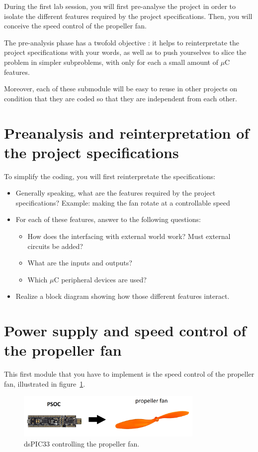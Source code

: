 \documentclass[11pt,a4paper]{article}
\theoremstyle{definition}%
\begin{document}
During the first lab session, you will first pre-analyse the project in order to isolate the different features required by the project specifications.
Then, you will conceive the speed control of the propeller fan.

The pre-analysis phase has a twofold objective : it helps to reinterpretate the project specifications with your words, as well as to push yourselves to slice the problem in simpler subproblems, with only for each a small amount of $\mu$C features.

Moreover, each of these submodule will be easy to reuse in other projects on condition that they are coded so that they are independent from each other.





\section{Preanalysis and reinterpretation of the project specifications}
To simplify the coding, you will first reinterpretate the specifications:
\begin{itemize}
	\item Generally speaking, what are the features required by the project specifications?
	Example: making the fan rotate at a controllable speed
	\item For each of these features, answer to the following questions:
	\begin{itemize}
		\item How does the interfacing with external world work?
		Must external circuits be added?
		\item What are the inputs and outputs?
		\item Which $\mu$C peripheral devices are used?
	\end{itemize}
	\item Realize a block diagram showing how those different features interact.
\end{itemize}






\section{Power supply and speed control of the propeller fan}
This first module that you have to implement is the speed control of the propeller fan, illustrated in figure~\ref{fig:helice}.

\begin{figure}[H]
\center
\includegraphics[width=0.8\textwidth]{alim-helice}
\caption{dsPIC33 controlling the propeller fan.}
\label{fig:helice}
\end{figure}
\end{document}
